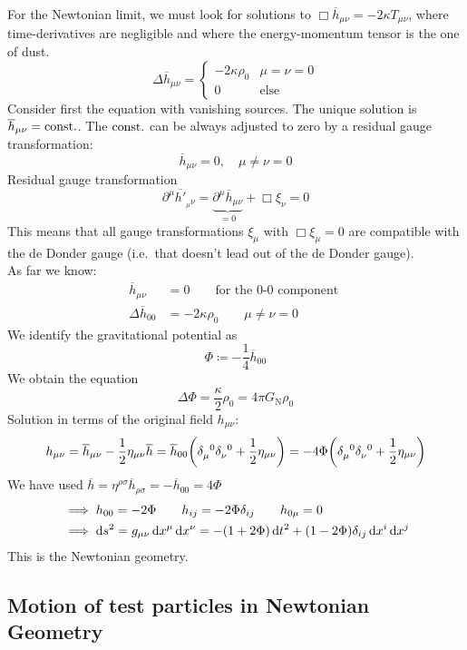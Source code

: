 For the Newtonian limit, we must look for solutions to $\Box \overline{h}_{\mu\nu} = - 2 \kappa T_{\mu\nu}$, where time-derivatives are 
negligible and where the energy-momentum tensor is the one of dust. 
\begin{equation}
    \Delta \overline{h}_{\mu\nu} = 
    \begin{cases}
    	-2 \kappa \rho_0 & \mu=\nu=0 \\
    	0 & \text{else}
    \end{cases}
\end{equation}
Consider first the  equation with vanishing sources. 
The unique solution is $\overline{h}_{\mu\nu} = \text{const.}$. The $\text{const.}$ can be always adjusted to zero by a residual gauge transformation:
\begin{equation}
    \overline{h}_{\mu\nu} = 0, \quad \mu \neq \nu = 0
\end{equation}
Residual gauge transformation
\begin{equation}
    \partial^\mu \overline{h'}_{_\mu\nu} = \underbrace{\partial^\mu \overline{h}_{\mu\nu}}_{=0} + \Box \xi_\nu = 0
\end{equation}
This means that all gauge transformations $\xi_\mu$ with $\Box \xi_\mu = 0$ are compatible with the de Donder gauge 
(i.e.\ that doesn't lead out of the de Donder gauge). \\
As far we know:
\begin{align}
    \overline{h}_{\mu\nu} &= 0 \qquad \text{for the 0-0 component } \\
    \Delta \overline{h}_{00} &= - 2\kappa \rho_0 \qquad \mu \neq \nu = 0
\end{align}
We identify the gravitational potential as
\begin{equation}
    \Phi \coloneqq -\frac{1}{4} \overline{h}_{00}
\end{equation}
We obtain the  equation
\begin{equation}
    \Delta \Phi = \frac{\kappa}{2} \rho_0 = 4 \pi G_\text{N} \rho_0
\end{equation}
Solution in terms of the original field $h_{\mu\nu}$:
\begin{equation}
    h_{\mu\nu} = \overline{h}_{\mu\nu} - \frac{1}{2} \eta_{\mu\nu} \overline{h} 
    = \overline{h}_{00} \left( \tensor{\delta}{_\mu^0} \tensor{\delta}{_\nu^0} + \frac{1}{2} \eta_{\mu\nu} \right) 
    = - 4\Phi \left( \tensor{\delta}{_\mu^0} \tensor{\delta}{_\nu^0} + \frac{1}{2} \eta_{\mu\nu} \right)
\end{equation}
We have used $\overline{h}=\eta^{\rho\sigma}\overline{h}_{\rho\sigma} = -\overline{h}_{00} = 4 \Phi$
\begin{align}
    & \implies h_{00}=-2\Phi \qquad h_{ij}=-2\Phi\delta_{ij} \qquad h_{0\mu}=0 \\
    & \implies \dif{s}^2 = g_{\mu\nu} \dif{x}^\mu \dif{x}^\nu = - (1+2\Phi)\dif{t}^2 + (1-2\Phi)\delta_{ij} \dif{x}^i \dif{x}^j
\end{align}
This is the Newtonian geometry.
\subsection{Motion of test particles in Newtonian Geometry}
